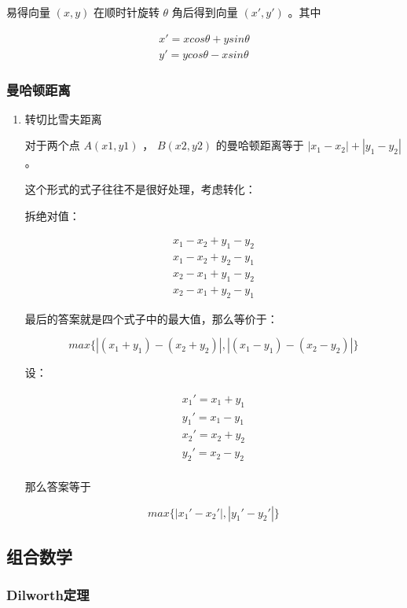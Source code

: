 \documentclass[11pt]{article}
\begin{document}
易得向量 $(x,y)$ 在顺时针旋转 $\theta$ 角后得到向量 $(x',y')$ 。其中

$$\begin{aligned}
x'=xcos \theta+ysin\theta \\
y'=ycos \theta-xsin\theta
\end{aligned}$$

\subsubsection{曼哈顿距离}
\label{sec-3-3-2}
\begin{enumerate}
\item 转切比雪夫距离
\label{sec-3-3-2-1}

对于两个点 $A(x1,y1)$ ， $B(x2,y2)$ 的曼哈顿距离等于 $|x_1-x_2|+|y_1-y_2|$ 。  

这个形式的式子往往不是很好处理，考虑转化：

拆绝对值：

$$\begin{aligned}
x_1-x_2+y_1-y_2 \\
x_1-x_2+y_2-y_1 \\
x_2-x_1+y_1-y_2 \\
x_2-x_1+y_2-y_1
\end{aligned}$$

最后的答案就是四个式子中的最大值，那么等价于：

$$
max\{|(x_1+y_1)-(x_2+y_2)|,|(x_1-y_1)-(x_2-y_2)|\}
$$

设：

$$\begin{aligned}
x_1'=x_1+y_1 \\
y_1'=x_1-y_1 \\
x_2'=x_2+y_2 \\
y_2'=x_2-y_2 \\
\end{aligned}$$


那么答案等于

$$
max\{|x_1'-x_2'|,|y_1'-y_2'|\}
$$
\end{enumerate}

\subsection{组合数学}
\label{sec-3-4}
\subsubsection{Dilworth定理}
\label{sec-3-4-1}
\end{document}

